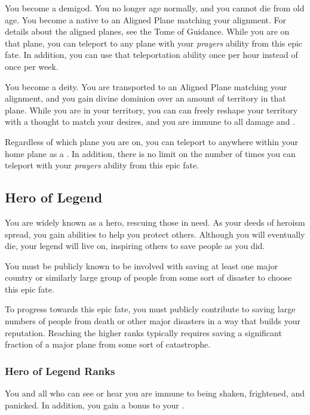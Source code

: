              You become a demigod.
            You no longer age normally, and you cannot die from old age.
            You become a  native to an Aligned Plane matching your alignment.
            For details about the aligned planes, see the Tome of Guidance.
            While you are on that plane, you can teleport to any plane with your \textit{prayers} ability from this epic fate.
            In addition, you can use that teleportation ability once per hour instead of once per week.

             You become a deity.
            You are transported to an Aligned Plane matching your alignment, and you gain divine dominion over an amount of territory in that plane.
            While you are in your territory, you can can freely reshape your territory with a thought to match your desires, and you are immune to all damage and .

            Regardless of which plane you are on, you can teleport to anywhere within your home plane as a .
            In addition, there is no limit on the number of times you can teleport with your \textit{prayers} ability from this epic fate.

    \subsection{Hero of Legend}
        You are widely known as a hero, rescuing those in need.
        As your deeds of heroism spread, you gain abilities to help you protect others.
        Although you will eventually die, your legend will live on, inspiring others to save people as you did.

         You must be publicly known to be involved with saving at least one major country or similarly large group of people from some sort of disaster to choose this epic fate.

         To progress towards this epic fate, you must publicly contribute to saving large numbers of people from death or other major disasters in a way that builds your reputation.
        Reaching the higher ranks typically requires saving a significant fraction of a major plane from some sort of catastrophe.

        \subsubsection{Hero of Legend Ranks}
             You and all  who can see or hear you are immune to being shaken, frightened, and panicked.
            In addition, you gain a  bonus to your .

